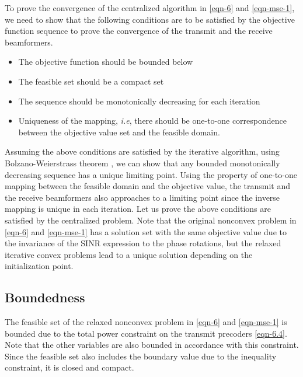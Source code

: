 \newcommand{\eqn}[1]{\(#1\)}
\newcommand{\mx}{\mbf{m}}
\newcommand{\my}{\mbf{w}}
\newcommand{\mz}{\mbfa{\gamma}}
\newcommand{\mxb}{{{\mbf{m}}}}
\newcommand{\myb}{{{\mbf{w}}}}
\newcommand{\iterate}[2]{{#1}^{(#2)}}
\newcommand{\iter}[3]{{#1}_{#2}^{(#3)}}

To prove the convergence of the centralized algorithm in \eqref{eqn-6} and \eqref{eqn-mse-1}, we need to show that the following conditions are to be satisfied by the objective function sequence to prove the convergence of the transmit and the receive beamformers.
\begin{itemize}
	\item The objective function should be bounded below
	\item The feasible set should be a compact set
	\item The sequence should be monotonically decreasing for each iteration
	\item Uniqueness of the mapping, \textit{i.e}, there should be one-to-one correspondence between the objective value set and the feasible domain.
\end{itemize}
Assuming the above conditions are satisfied by the iterative algorithm, using Bolzano-Weierstrass theorem \cite{rudin1964principles}, we can show that any bounded monotonically decreasing sequence has a unique limiting point. Using the property of one-to-one mapping between the feasible domain and the objective value, the transmit and the receive beamformers also approaches to a limiting point since the inverse mapping is unique in each iteration. Let us prove the above conditions are satisfied by the centralized problem. Note that the original nonconvex problem in \eqref{eqn-6} and \eqref{eqn-mse-1} has a solution set with the same objective value due to the invariance of the \ac{SINR} expression to the phase rotations, but the relaxed iterative convex problems lead to a unique solution depending on the initialization point.

\subsection{Boundedness}

The feasible set of the relaxed nonconvex problem in \eqref{eqn-6} and \eqref{eqn-mse-1} is bounded due to the total power constraint on the transmit precoders \eqref{eqn-6.4}. Note that the other variables are also bounded in accordance with this constraint. Since the feasible set also includes the boundary value due to the inequality constraint, it is closed and compact. 

